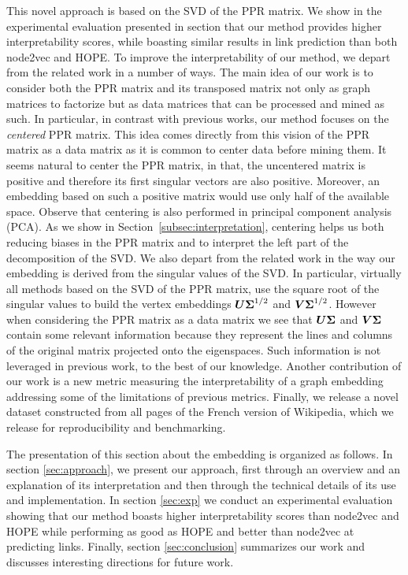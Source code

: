 This novel approach is based on the SVD of the PPR matrix. We show in the experimental evaluation presented in section  that our method provides higher interpretability scores, while boasting similar results in link prediction than both node2vec and HOPE. To improve the interpretability of our method, we depart from the related work in a number of ways. The main idea of our work is to consider both the PPR matrix and its transposed matrix not only as graph matrices to factorize but as data matrices that can be processed and mined as such. In particular, in contrast with previous works, our method focuses on the \textit{centered} PPR matrix. This idea comes directly from this vision of the PPR matrix as a data matrix as it is common to center data before mining them. It seems natural to center the PPR matrix, in that, the uncentered matrix is positive and therefore its first singular vectors are also positive. Moreover, an embedding based on such a positive matrix would use only half of the available space. Observe that centering is also performed in principal component analysis (PCA). As we show in Section~\ref{subsec:interpretation}, centering helps us both reducing biases in the PPR matrix and to interpret the left part of the decomposition of the SVD. We also depart from the related work in the way our embedding is derived from the singular values of the SVD. In particular, virtually all methods based on the SVD of the PPR matrix, use the square root of the singular values to build the vertex embeddings $\boldsymbol{U}\boldsymbol{\Sigma}^{1/2}$ and $\boldsymbol{V}\boldsymbol{\Sigma}^{1/2}$. However when considering the PPR matrix as a data matrix we see that $\boldsymbol{U}\boldsymbol{\Sigma}$ and $\boldsymbol{V}\boldsymbol{\Sigma}$ contain some relevant information because they represent the lines and columns of the original matrix projected onto the eigenspaces. Such information is not leveraged in previous work, to the best of our knowledge.  Another contribution of our work is a new metric measuring the interpretability of a graph embedding addressing some of the limitations of previous metrics. Finally, we release a novel dataset constructed from all pages of the French version of Wikipedia, which we release for reproducibility and benchmarking.

The presentation of this section about the \parfaite{} embedding is organized as follows. In section \ref{sec:approach}, we present our approach, first through an overview and an explanation of its interpretation and then through the technical details of its use and implementation. 
In section \ref{sec:exp} we conduct an experimental evaluation showing that our method boasts higher interpretability scores than node2vec and HOPE while performing as good as HOPE and better than node2vec at predicting links.
Finally, section \ref{sec:conclusion} summarizes our work and discusses interesting directions for future work.


